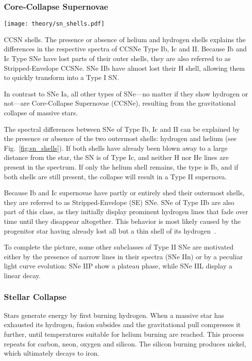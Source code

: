 \subsubsection{Core-Collapse Supernovae}\label{ccsne}

\begin{marginfigure}
    \texttt{[image: theory/sn\_shells.pdf]}
    \caption[CCSN shells]{CCSN shells. The presence or absence of helium and hydrogen shells explains the differences in the respective spectra of CCSNe Type Ib, Ic and II. Because Ib and Ic Type SNe have lost parts of their outer shells, they are also referred to as Stripped-Envelope CCSNe. SNe IIb have almost lost their H shell, allowing them to quickly transform into a Type I SN.}
\end{marginfigure}

In contrast to SNe Ia, all other types of SNe---no matter if they show hydrogen or not---are Core-Collapse Supernovae (CCSNe), resulting from the gravitational collapse of massive stars.

The spectral differences between SNe of Type Ib, Ic and II can be explained by the presence or absence of the two outermost shells: hydrogen and helium (see Fig.~\ref{fig:sn_shells}). If both shells have already been blown away to a large distance from the star, the SN is of Type Ic, and neither H nor He lines are present in the spectrum. If only the helium shell remains, the type is Ib, and if both shells are still present, the collapse will result in a Type II supernova.

Because Ib and Ic supernovae have partly or entirely shed their outermost shells, they are referred to as Stripped-Envelope (SE) SNe. SNe of Type IIb are also part of this class, as they initially display prominent hydrogen lines that fade over time until they disappear altogether. This behavior is most likely caused by the progenitor star having already lost all but a thin shell of its hydrogen~.

To complete the picture, some other subclasses of Type II SNe are motivated either by the presence of narrow lines in their spectra (SNe IIn) or by a peculiar light curve evolution: SNe IIP show a plateau phase, while SNe IIL display a linear decay.

\subsubsection{Stellar Collapse}
Stars generate energy by first burning hydrogen. When a massive star has exhausted its hydrogen, fusion subsides and the gravitational pull compresses it further, until temperatures suitable for helium burning are reached. This process repeats for carbon, neon, oxygen and silicon. The silicon burning produces nickel, which ultimately decays to iron.

